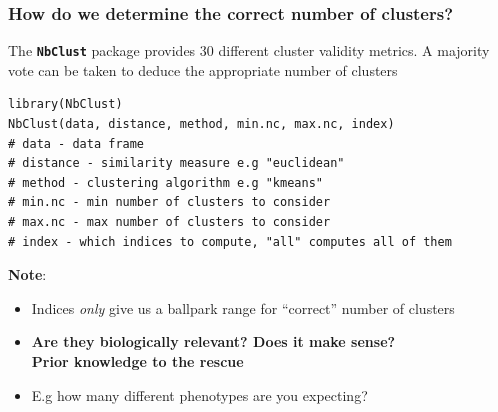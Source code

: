 \documentclass[pdf]{beamer}
\begin{document}


\begin{frame}[fragile]
\frametitle{How do we determine the correct number of clusters?}
The \textbf{\texttt{NbClust}} package provides 30 different cluster validity metrics. A majority vote can be
taken to deduce the appropriate number of clusters
\vfill
\begin{lstlisting}[style=RCode]
library(NbClust)
NbClust(data, distance, method, min.nc, max.nc, index)
# data - data frame 
# distance - similarity measure e.g "euclidean"
# method - clustering algorithm e.g "kmeans"
# min.nc - min number of clusters to consider
# max.nc - max number of clusters to consider
# index - which indices to compute, "all" computes all of them
\end{lstlisting}
\vspace{-0.5cm}
\textbf{Note}: 
\begin{itemize}\addtolength{\itemsep}{0.3\baselineskip}
	\item Indices \textit{only} give us a ballpark range for ``correct'' number of clusters
	\item {\large \textbf{Are they biologically relevant? Does it make sense?\\Prior knowledge to the rescue}}
	\item E.g how many different phenotypes are you expecting?
\end{itemize}
\end{frame}
\end{document}
